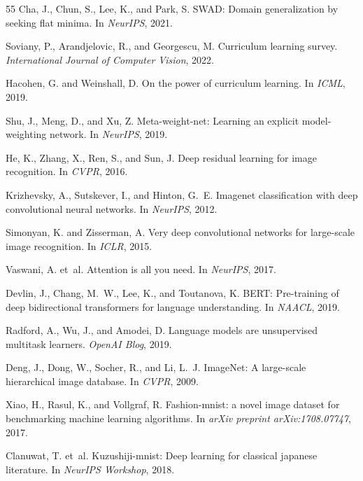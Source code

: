 \documentclass{article}
\theoremstyle{plain}
\theoremstyle{definition}
\theoremstyle{remark}
\begin{document}
\begin{thebibliography}{55}
Cha, J., Chun, S., Lee, K., and Park, S.
\newblock SWAD: Domain generalization by seeking flat minima.
\newblock In \emph{NeurIPS}, 2021.

Soviany, P., Arandjelovic, R., and Georgescu, M.
\newblock Curriculum learning survey.
\newblock \emph{International Journal of Computer Vision}, 2022.

Hacohen, G. and Weinshall, D.
\newblock On the power of curriculum learning.
\newblock In \emph{ICML}, 2019.

Shu, J., Meng, D., and Xu, Z.
\newblock Meta-weight-net: Learning an explicit model-weighting network.
\newblock In \emph{NeurIPS}, 2019.

He, K., Zhang, X., Ren, S., and Sun, J.
\newblock Deep residual learning for image recognition.
\newblock In \emph{CVPR}, 2016.

Krizhevsky, A., Sutskever, I., and Hinton, G.~E.
\newblock Imagenet classification with deep convolutional neural networks.
\newblock In \emph{NeurIPS}, 2012.

Simonyan, K. and Zisserman, A.
\newblock Very deep convolutional networks for large-scale image recognition.
\newblock In \emph{ICLR}, 2015.

Vaswani, A. et~al.
\newblock Attention is all you need.
\newblock In \emph{NeurIPS}, 2017.

Devlin, J., Chang, M.~W., Lee, K., and Toutanova, K.
\newblock BERT: Pre-training of deep bidirectional transformers for language understanding.
\newblock In \emph{NAACL}, 2019.

Radford, A., Wu, J., and Amodei, D.
\newblock Language models are unsupervised multitask learners.
\newblock \emph{OpenAI Blog}, 2019.

Deng, J., Dong, W., Socher, R., and Li, L.~J.
\newblock ImageNet: A large-scale hierarchical image database.
\newblock In \emph{CVPR}, 2009.

Xiao, H., Rasul, K., and Vollgraf, R.
\newblock Fashion-mnist: a novel image dataset for benchmarking machine learning algorithms.
\newblock In \emph{arXiv preprint arXiv:1708.07747}, 2017.

Clanuwat, T. et~al.
\newblock Kuzushiji-mnist: Deep learning for classical japanese literature.
\newblock In \emph{NeurIPS Workshop}, 2018.


\end{thebibliography}
\end{document}
